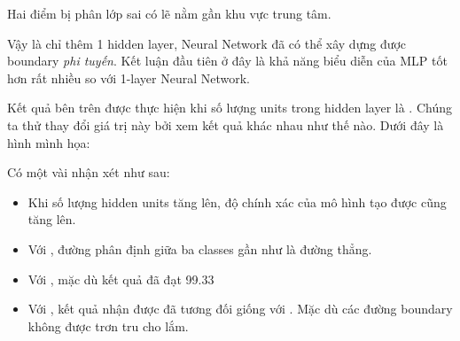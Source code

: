  
Hai điểm bị phân lớp sai có lẽ nằm gần khu vực trung tâm. 
 
Vậy là chỉ thêm 1 hidden layer, Neural Network đã có thể xây dựng được boundary \textit{phi tuyến}. Kết luận đầu tiên ở đây là khả năng biểu diễn của MLP tốt hơn rất nhiều so với 1-layer Neural Network. 
 
 
 
Kết quả bên trên được thực hiện khi số lượng units trong hidden layer là . Chúng ta thử thay đổi giá trị này bởi  xem kết quả khác nhau như thế nào. Dưới đây là hình mình họa: 
 
 
 
Có một vài nhận xét như sau: 
\begin{itemize}
    \item Khi số lượng hidden units tăng lên, độ chính xác của mô hình tạo được cũng tăng lên. 
     
    \item Với , đường phân định giữa ba classes gần như là đường thẳng. 
     
    \item Với , mặc dù kết quả đã đạt 99.33%
     
    \item Với , kết quả nhận được đã tương đối giống với . Mặc dù các đường boundary không được trơn tru cho lắm. 
\end{itemize}
 
